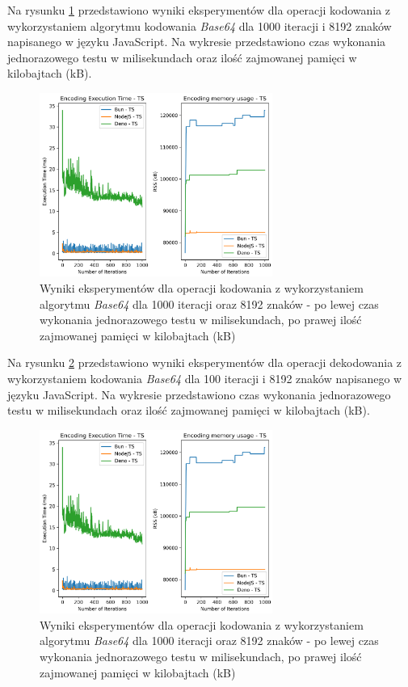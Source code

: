 Na rysunku \ref{fig:encoding_e2_ts} przedstawiono wyniki eksperymentów dla operacji kodowania z wykorzystaniem algorytmu kodowania \textit{Base64} dla 1000 iteracji i 8192 znaków napisanego w języku JavaScript. Na wykresie przedstawiono czas wykonania jednorazowego testu w milisekundach oraz ilość zajmowanej pamięci w kilobajtach (kB).

\begin{figure}[H]
  \centering
  \includegraphics[width=0.68\textwidth]{Figures/coding/base64_1000_encoding_ts.png}
  \caption{Wyniki eksperymentów dla operacji kodowania z wykorzystaniem algorytmu \textit{Base64} dla 1000 iteracji oraz 8192 znaków - po lewej czas wykonania jednorazowego testu w milisekundach, po prawej ilość zajmowanej pamięci w kilobajtach (kB)}
  \label{fig:encoding_e2_ts}
\end{figure}

Na rysunku \ref{fig:decoding_e2_ts} przedstawiono wyniki eksperymentów dla operacji dekodowania z wykorzystaniem kodowania \textit{Base64} dla 100 iteracji i 8192 znaków napisanego w języku JavaScript. Na wykresie przedstawiono czas wykonania jednorazowego testu w milisekundach oraz ilość zajmowanej pamięci w kilobajtach (kB).

\begin{figure}[H]
  \centering
  \includegraphics[width=0.68\textwidth]{Figures/coding/base64_1000_encoding_ts.png}
  \caption{Wyniki eksperymentów dla operacji kodowania z wykorzystaniem algorytmu \textit{Base64} dla 1000 iteracji oraz 8192 znaków - po lewej czas wykonania jednorazowego testu w milisekundach, po prawej ilość zajmowanej pamięci w kilobajtach (kB)}
  \label{fig:decoding_e2_ts}
\end{figure}

